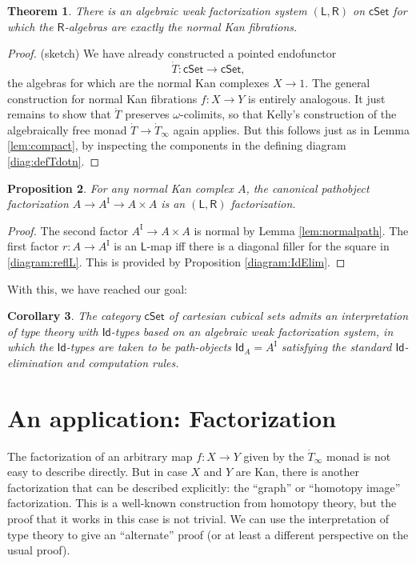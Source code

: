 \documentclass[12pt]{article}
\newcommand{\cSet}{\ensuremath{\mathsf{cSet}}}
\newcommand{\LL}{\ensuremath{\mathsf{L}}}
\newcommand{\RR}{\ensuremath{\mathsf{R}}}
\newcommand{\I}{\ensuremath{\mathrm{I}}}
\newcommand{\Id}{\ensuremath{\mathsf{Id}}}
\newcommand{\id}[1]{\Id_{#1}}
\newtheorem{theorem}{Theorem}
\newtheorem{proposition}[theorem]{Proposition}
\newtheorem{corollary}[theorem]{Corollary}
\theoremstyle{remark}
\theoremstyle{definition}
\begin{document}
\begin{theorem}\label{thm:AWFS2}
There is an algebraic weak factorization system $(\LL,\RR)$ on $\cSet$ for which the $\RR$-algebras are exactly the normal Kan fibrations. \end{theorem}

\begin{proof}(sketch)
We have already constructed a pointed endofunctor $$\dot{T} :\cSet\to\cSet,$$ the algebras for which are the normal Kan complexes $X\to 1$.   The general construction for normal Kan fibrations $f:X\to Y$ is entirely analogous.  It just remains to show that $\dot{T}$ preserves $\omega$-colimits, so that Kelly's construction of the algebraically free monad $\dot{T}\to \dot{T}_\infty$ again applies. But this follows just as in Lemma \ref{lem:compact}, by inspecting the components in the defining diagram \eqref{diag:defTdotn}.
\end{proof}

\begin{proposition}
For any normal Kan complex $A$, the canonical pathobject factorization $A\to A^\I\to A\times A$ is an $(\LL,\RR)$ factorization.
\end{proposition}

\begin{proof}
The second factor $A^\I\to A\times A$ is normal by Lemma \ref{lem:normalpath}. The first factor $r:A\to A^\I$ is an $\LL$-map iff there is a diagonal filler for the square in \eqref{diagram:reflL}.  This is provided by Proposition \ref{diagram:IdElim}.
\end{proof}

With this, we have reached our goal: 
\begin{corollary}
The category $\cSet$ of cartesian cubical sets admits an interpretation of type theory with \Id-types based on an algebraic weak factorization system, in which the \Id-types are taken to be path-objects $\id{A} = A^\I$ satisfying the standard \Id-elimination and computation rules.  
\end{corollary}

\section{An application: Factorization}

The factorization of an arbitrary  map $f:X\to Y$ given by the $\dot{T}_\infty$ monad is not easy to describe directly.  But in case $X$ and $Y$ are Kan, there is another factorization that can be described explicitly: the ``graph'' or ``homotopy image'' factorization. This is a well-known construction from homotopy theory, but the proof that it works in this case is not trivial.  We can use  the interpretation of type theory to give an ``alternate'' proof (or at least a different perspective on the usual proof).
\end{document}
